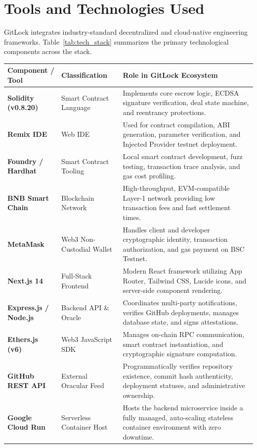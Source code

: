 \documentclass[11pt,a4paper]{article}
\begin{document}
\section{Tools and Technologies Used}
GitLock integrates industry-standard decentralized and cloud-native engineering frameworks. Table~\ref{tab:tech_stack} summarizes the primary technological components across the stack.

\begin{table}[H]
\centering
\small
\begin{tabularx}{\textwidth}{p{3.2cm} p{3.2cm} X}
\toprule
\textbf{Component / Tool} & \textbf{Classification} & \textbf{Role in GitLock Ecosystem} \\
\midrule
\textbf{Solidity (v0.8.20)} & Smart Contract Language & Implements core escrow logic, ECDSA signature verification, deal state machine, and reentrancy protections. \\
\textbf{Remix IDE} & Web IDE & Used for contract compilation, ABI generation, parameter verification, and Injected Provider testnet deployment. \\
\textbf{Foundry / Hardhat} & Smart Contract Tooling & Local smart contract development, fuzz testing, transaction trace analysis, and gas cost profiling. \\
\textbf{BNB Smart Chain} & Blockchain Network & High-throughput, EVM-compatible Layer-1 network providing low transaction fees and fast settlement times. \\
\textbf{MetaMask} & Web3 Non-Custodial Wallet & Handles client and developer cryptographic identity, transaction authorization, and gas payment on BSC Testnet. \\
\textbf{Next.js 14} & Full-Stack Frontend & Modern React framework utilizing App Router, Tailwind CSS, Lucide icons, and server-side component rendering. \\
\textbf{Express.js / Node.js} & Backend API \& Oracle & Coordinates multi-party notifications, verifies GitHub deployments, manages database state, and signs attestations. \\
\textbf{Ethers.js (v6)} & Web3 JavaScript SDK & Manages on-chain RPC communication, smart contract instantiation, and cryptographic signature computation. \\
\textbf{GitHub REST API} & External Oracular Feed & Programmatically verifies repository existence, commit hash authenticity, deployment statuses, and administrative ownership. \\
\textbf{Google Cloud Run} & Serverless Container Host & Hosts the backend microservice inside a fully managed, auto-scaling stateless container environment with zero downtime. \\

\end{tabularx}
\end{table}
\end{document}
